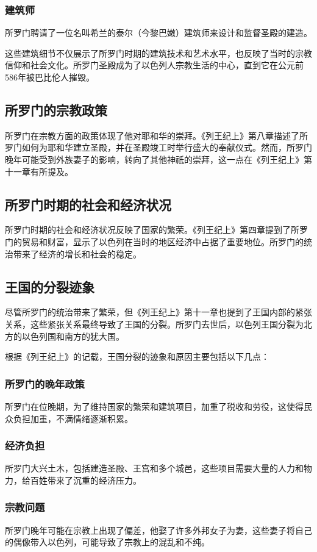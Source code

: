 \documentclass[12pt, a4paper]{ctexart}
\begin{document}
\subsubsection{建筑师}
所罗门聘请了一位名叫希兰的泰尔（今黎巴嫩）建筑师来设计和监督圣殿的建造。

这些建筑细节不仅展示了所罗门时期的建筑技术和艺术水平，也反映了当时的宗教信仰和社会文化。所罗门圣殿成为了以色列人宗教生活的中心，直到它在公元前586年被巴比伦人摧毁。


\subsection{所罗门的宗教政策}
所罗门在宗教方面的政策体现了他对耶和华的崇拜。《列王纪上》第八章描述了所罗门如何为耶和华建立圣殿，并在圣殿竣工时举行盛大的奉献仪式。然而，所罗门晚年可能受到外族妻子的影响，转向了其他神祇的崇拜，这一点在《列王纪上》第十一章有所提及。

\subsection{所罗门时期的社会和经济状况}
所罗门时期的社会和经济状况反映了国家的繁荣。《列王纪上》第四章提到了所罗门的贸易和财富，显示了以色列在当时的地区经济中占据了重要地位。所罗门的统治带来了经济的增长和社会的稳定。

\subsection{王国的分裂迹象}
尽管所罗门的统治带来了繁荣，但《列王纪上》第十一章也提到了王国内部的紧张关系，这些紧张关系最终导致了王国的分裂。所罗门去世后，以色列王国分裂为北方的以色列国和南方的犹大国。

根据《列王纪上》的记载，王国分裂的迹象和原因主要包括以下几点：

\subsubsection{所罗门的晚年政策}
所罗门在位晚期，为了维持国家的繁荣和建筑项目，加重了税收和劳役，这使得民众负担加重，不满情绪逐渐积累。

\subsubsection{经济负担}
所罗门大兴土木，包括建造圣殿、王宫和多个城邑，这些项目需要大量的人力和物力，给百姓带来了沉重的经济压力。

\subsubsection{宗教问题}
所罗门晚年可能在宗教上出现了偏差，他娶了许多外邦女子为妻，这些妻子将自己的偶像带入以色列，可能导致了宗教上的混乱和不纯。
\end{document}
